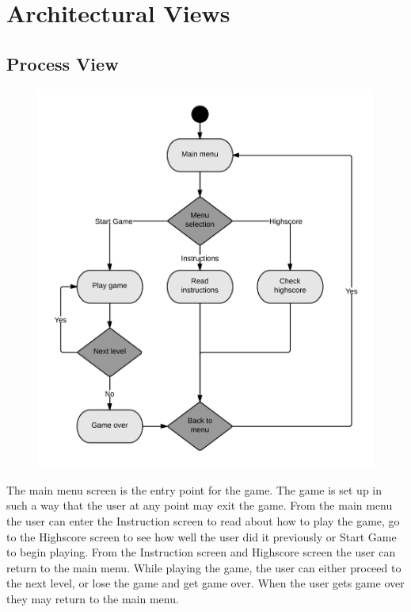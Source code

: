 \section{Architectural Views}

\subsection*{Process View}

	\begin{figure}[H]
	\centering
	\includegraphics[width=\textwidth]{pictures/activity_diagram}
	\end{figure}

	The main menu screen is the entry point for the game. The game is set up in such a way that the 
	user at any point may exit the game. From the main menu the user can enter the Instruction screen 
	to read about how to play the game, go to the Highscore screen to see how well the user did it 
	previously or Start Game to begin playing. From the Instruction screen and Highscore screen the 
	user can return to the main menu. While playing the game, the user can either proceed to the 
	next level, or lose the game and get game over. When the user gets game over they may return to 
	the main menu.

